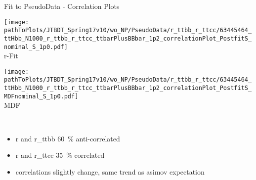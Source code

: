 \begin{frame}{Fit to PseudoData - Correlation Plots}
\begin{minipage}{\textwidth}

\begin{minipage}{0.48\textwidth}
\begin{center}
\texttt{[image: \\pathToPlots/JTBDT\_Spring17v10/wo\_NP/PseudoData/r\_ttbb\_r\_ttcc/63445464\_ttHbb\_N1000\_r\_ttbb\_r\_ttcc\_ttbarPlusBBbar\_1p2\_correlationPlot\_PostfitS\_nominal\_S\_1p0.pdf]}\\
\vskip -0.2cm
r-Fit
\end{center}
\end{minipage}
\begin{minipage}{0.48\textwidth}
\begin{center}
\texttt{[image: \\pathToPlots/JTBDT\_Spring17v10/wo\_NP/PseudoData/r\_ttbb\_r\_ttcc/63445464\_ttHbb\_N1000\_r\_ttbb\_r\_ttcc\_ttbarPlusBBbar\_1p2\_correlationPlot\_PostfitS\_MDFnominal\_S\_1p0.pdf]}\\
\vskip -0.2cm
MDF
\end{center}
\end{minipage}
\\

%
%
\end{minipage}
\begin{minipage}{\textwidth}

\begin{itemize}
\item r and r\_ttbb \SI[round-precision=0]{60}{\percent} anti-correlated
\item r and r\_ttcc \SI[round-precision=0]{35}{\percent} correlated
\item correlations slightly change, same trend as asimov expectation
\end{itemize}
\end{minipage}
\end{frame}

